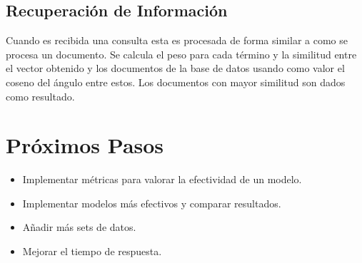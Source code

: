 \documentclass[a4paper,11pt]{article}
\begin{document}
\subsection{Recuperación de Información}

Cuando es recibida una consulta esta es procesada de forma similar a como se procesa un documento. Se calcula el peso para cada término y la similitud entre el vector obtenido y los documentos de la base de datos usando como valor el coseno del ángulo entre estos. Los documentos con mayor similitud son dados como resultado.


\section{Próximos Pasos}

  \begin{itemize}
    \item Implementar métricas para valorar la efectividad de un modelo.
    \item Implementar modelos más efectivos y comparar resultados.
    \item Añadir más sets de datos.
    \item Mejorar el tiempo de respuesta.
  \end{itemize}
\end{document}
